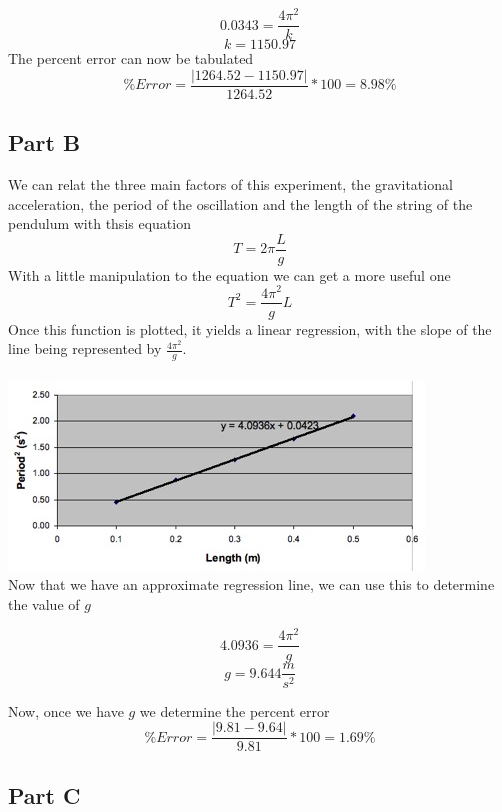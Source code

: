 \documentclass[titlepage]{article}
\begin{document}
\[
	0.0343 = \frac{4 \pi^2}{k}
\]
\[
	k = 1150.97
\]
The percent error can now be tabulated
\[
	\% Error = \frac{|1264.52 - 1150.97|}{1264.52} * 100 = 8.98\%
\]

\subsection{Part B}\label{sub:part_b}
We can relat the three main factors of this experiment, the gravitational acceleration, the period of the oscillation and the length of the string of the pendulum with thsis equation
\begin{equation}
	T = 2 \pi \frac{L}{g}
\end{equation}
With a little manipulation to the equation we can get a more useful one
\begin{equation}
	T^2 = \frac{4 \pi^2}{g} L
\end{equation}
Once this function is plotted, it yields a linear regression, with the slope of the line being represented by $\frac{4 \pi^2}{g}$.
\\
\\
\includegraphics{graphB.jpg}
\\
Now that we have an approximate regression line, we can use this to determine the value of $g$

\[
	4.0936 = \frac{4 \pi^2}{g}
\]
\[
	g = 9.644 \frac{m}{s^2}
\]

Now, once we have $g$ we determine the percent error
\[
	\% Error = \frac{|9.81 - 9.64|}{9.81} * 100 = 1.69\%
\]

\subsection{Part C}\label{sub:part_c}
\end{document}
